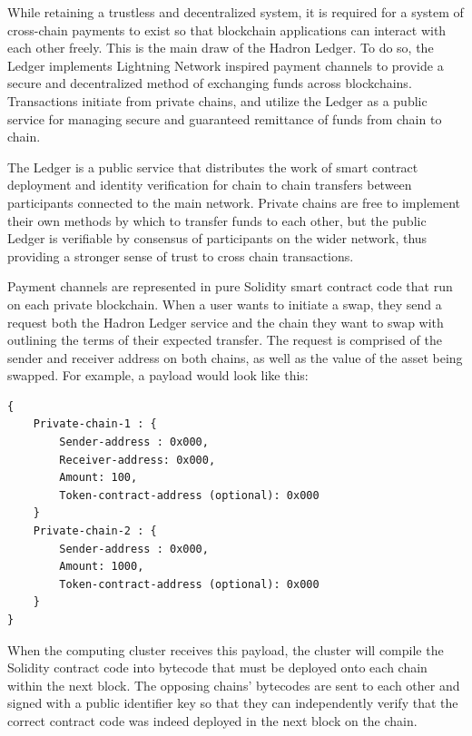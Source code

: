 \documentclass{%
	article}
\begin{document}
While retaining a trustless and decentralized system, it is required for a system of cross-chain payments to exist so that blockchain applications can interact with each other freely. This is the main draw of the Hadron Ledger. To do so, the Ledger implements Lightning Network inspired payment channels to provide a secure and decentralized method of exchanging funds across blockchains. Transactions initiate from private chains, and utilize the Ledger as a public service for managing secure and guaranteed remittance of funds from chain to chain.

The Ledger is a public service that distributes the work of smart contract deployment and identity verification for chain to chain transfers between participants connected to the main network. Private chains are free to implement their own methods by which to transfer funds to each other, but the public Ledger is verifiable by consensus of participants on the wider network, thus providing a stronger sense of trust to cross chain transactions.

Payment channels are represented in pure Solidity smart contract code that run on each private blockchain. When a user wants to initiate a swap, they send a request both the Hadron Ledger service and the chain they want to swap with outlining the terms of their expected transfer. The request is comprised of the sender and receiver address on both chains, as well as the value of the asset being swapped. For example, a payload would look like this:

\begin{lstlisting}
{
    Private-chain-1 : {
        Sender-address : 0x000,
        Receiver-address: 0x000,
        Amount: 100,
        Token-contract-address (optional): 0x000
    }
    Private-chain-2 : {
        Sender-address : 0x000,
        Amount: 1000,
        Token-contract-address (optional): 0x000
    }
}
\end{lstlisting}

When the computing cluster receives this payload, the cluster will compile the Solidity contract code into bytecode that must be deployed onto each chain within the next block. The opposing chains’ bytecodes are sent to each other and signed with a public identifier key so that they can independently verify that the correct contract code was indeed deployed in the next block on the chain.
\end{document}
